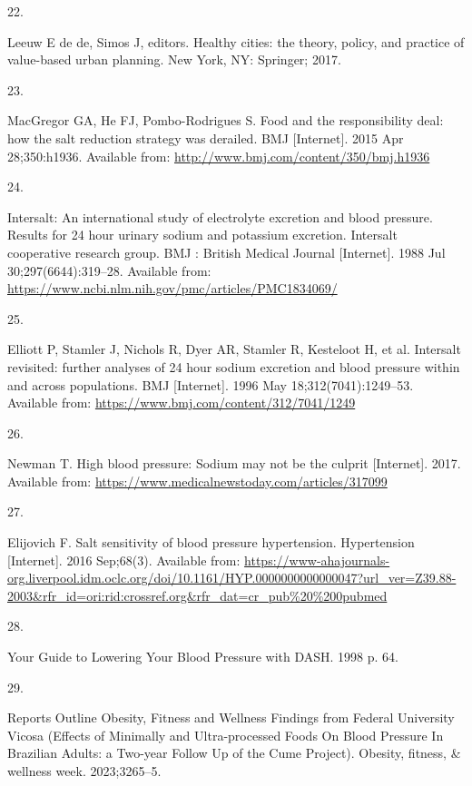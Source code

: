 \documentclass[
]{article}
\newlength{\cslhangindent}
\newlength{\csllabelwidth}
\newlength{\cslentryspacingunit} %
\newenvironment{CSLReferences}[2] %
 {%
  \setlength{\parindent}{0pt}
  \ifodd #1
  \let\oldpar\par
  \def\par{\hangindent=\cslhangindent\oldpar}
  \fi
  \setlength{\parskip}{#2\cslentryspacingunit}
 }%
 {}
\newcommand{\CSLLeftMargin}[1]{\parbox[t]{\csllabelwidth}{#1}}
\newcommand{\CSLRightInline}[1]{\parbox[t]{\linewidth - \csllabelwidth}{#1}\break}
\begin{document}
\begin{CSLReferences}{0}{0}
\leavevmode{}%
\CSLLeftMargin{22. }%
\CSLRightInline{Leeuw E de de, Simos J, editors. Healthy cities: the
theory, policy, and practice of value-based urban planning. New York,
NY: Springer; 2017. }

\leavevmode{}%
\CSLLeftMargin{23. }%
\CSLRightInline{MacGregor GA, He FJ, Pombo-Rodrigues S. Food and the
responsibility deal: how the salt reduction strategy was derailed. BMJ
{[}Internet{]}. 2015 Apr 28;350:h1936. Available from:
\url{http://www.bmj.com/content/350/bmj.h1936}}

\leavevmode{}%
\CSLLeftMargin{24. }%
\CSLRightInline{Intersalt: An international study of electrolyte
excretion and blood pressure. Results for 24 hour urinary sodium and
potassium excretion. Intersalt cooperative research group. BMJ : British
Medical Journal {[}Internet{]}. 1988 Jul 30;297(6644):319--28. Available
from: \url{https://www.ncbi.nlm.nih.gov/pmc/articles/PMC1834069/}}

\leavevmode{}%
\CSLLeftMargin{25. }%
\CSLRightInline{Elliott P, Stamler J, Nichols R, Dyer AR, Stamler R,
Kesteloot H, et al. Intersalt revisited: further analyses of 24 hour
sodium excretion and blood pressure within and across populations. BMJ
{[}Internet{]}. 1996 May 18;312(7041):1249--53. Available from:
\url{https://www.bmj.com/content/312/7041/1249}}

\leavevmode{}%
\CSLLeftMargin{26. }%
\CSLRightInline{Newman T. High blood pressure: Sodium may not be the
culprit {[}Internet{]}. 2017. Available from:
\url{https://www.medicalnewstoday.com/articles/317099}}

\leavevmode{}%
\CSLLeftMargin{27. }%
\CSLRightInline{Elijovich F. Salt sensitivity of blood pressure
\textbar{} hypertension. Hypertension {[}Internet{]}. 2016 Sep;68(3).
Available from:
\url{https://www-ahajournals-org.liverpool.idm.oclc.org/doi/10.1161/HYP.0000000000000047?url_ver=Z39.88-2003\&rfr_id=ori:rid:crossref.org\&rfr_dat=cr_pub\%20\%200pubmed}}

\leavevmode{}%
\CSLLeftMargin{28. }%
\CSLRightInline{Your Guide to Lowering Your Blood Pressure with DASH.
1998 p. 64. }

\leavevmode{}%
\CSLLeftMargin{29. }%
\CSLRightInline{Reports Outline Obesity, Fitness and Wellness Findings
from Federal University Vicosa (Effects of Minimally and Ultra-processed
Foods On Blood Pressure In Brazilian Adults: a Two-year Follow Up of the
Cume Project). Obesity, fitness, \& wellness week. 2023;3265--5. }


\end{CSLReferences}
\end{document}
